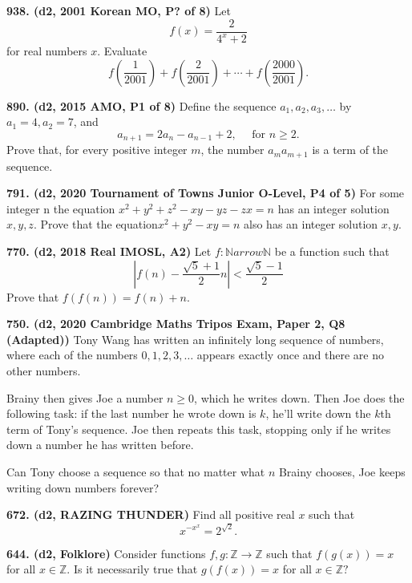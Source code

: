 \documentclass{article}
\begin{document}
\textbf{938. (\color{red}d2\color{black}, 2001 Korean MO, P? of 8)} Let \begin{equation*}f(x) = \frac{2}{4^x + 2}\end{equation*} for real numbers $x$. Evaluate \begin{equation*}f(\frac{1}{2001}) + f(\frac{2}{2001}) + \cdots + f(\frac{2000}{2001}).\end{equation*}

\textbf{890. (\color{red}d2\color{black}, 2015 AMO, P1 of 8)} Define the sequence $a_{1}, a_{2}, a_{3}, \ldots$ by $a_{1}=4, a_{2}=7$, and $$ a_{n+1}=2 a_{n}-a_{n-1}+2, \quad \text { for } n \geq 2. $$ Prove that, for every positive integer $m$, the number $a_{m} a_{m+1}$ is a term of the sequence.

\textbf{791. (\color{red}d2\color{black}, 2020 Tournament of Towns Junior O-Level, P4 of 5)} For some integer n the equation $x^2 + y^2 + z^2 -xy -yz - zx = n$ has an integer solution $x, y, z$. Prove that the equation$ x^2 + y^2 - xy = n$ also has an integer solution $x, y$.

\textbf{770. (\color{red}d2\color{black}, 2018 Real IMOSL, A2)} Let $f: \mathbb{N} arrow \mathbb{N}$ be a function such that $$|f(n)-\frac{\sqrt{5}+1}{2} n|<\frac{\sqrt{5}-1}{2}$$ Prove that $f(f(n))=f(n)+n$.

\textbf{750. (\color{red}d2\color{black}, 2020 Cambridge Maths Tripos Exam, Paper 2, Q8 (Adapted))} Tony Wang has written an infinitely long sequence of numbers, where each of the numbers $0, 1, 2, 3, \dots$ appears exactly once and there are no other numbers.\\

\vspace{0.75em}

Brainy then gives Joe a number $n \geq 0$, which he writes down. Then Joe does the following task: if the last number he wrote down is $k$, he'll write down the $k$th term of Tony's sequence. Joe then repeats this task, stopping only if he writes down a number he has written before.\\

\vspace{0.75em}

Can Tony choose a sequence so that no matter what $n$ Brainy chooses, Joe keeps writing down numbers forever?

\textbf{672. (\color{red}d2\color{black}, RAZING THUNDER)} Find all positive real $x$ such that $$x^{-x^x}=2^{\sqrt2}.$$

\textbf{644. (\color{red}d2\color{black}, Folklore)} Consider functions $f, g: \mathbb{Z} \to \mathbb{Z}$ such that $f(g(x)) = x$ for all $x \in \mathbb{Z}.$ Is it necessarily true that $g(f(x)) = x$ for all $x \in \mathbb{Z}?$
\end{document}

